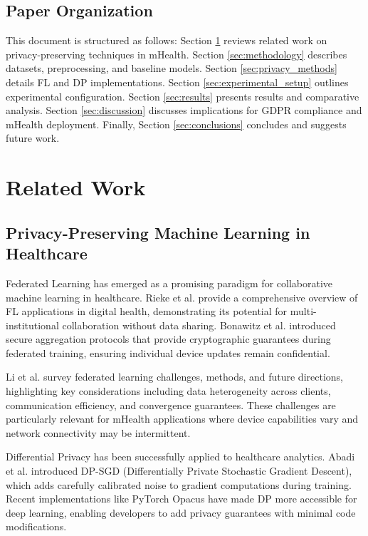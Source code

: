 \documentclass[conference]{IEEEtran}
\begin{document}
\subsection{Paper Organization}

This document is structured as follows: Section \ref{sec:related_work} reviews related work on privacy-preserving techniques in mHealth. Section \ref{sec:methodology} describes datasets, preprocessing, and baseline models. Section \ref{sec:privacy_methods} details FL and DP implementations. Section \ref{sec:experimental_setup} outlines experimental configuration. Section \ref{sec:results} presents results and comparative analysis. Section \ref{sec:discussion} discusses implications for GDPR compliance and mHealth deployment. Finally, Section \ref{sec:conclusions} concludes and suggests future work.

\section{Related Work}
\label{sec:related_work}

\subsection{Privacy-Preserving Machine Learning in Healthcare}

Federated Learning has emerged as a promising paradigm for collaborative machine learning in healthcare. Rieke et al. \cite{rieke2020future} provide a comprehensive overview of FL applications in digital health, demonstrating its potential for multi-institutional collaboration without data sharing. Bonawitz et al. \cite{bonawitz2017practical} introduced secure aggregation protocols that provide cryptographic guarantees during federated training, ensuring individual device updates remain confidential.

Li et al. \cite{li2020federated} survey federated learning challenges, methods, and future directions, highlighting key considerations including data heterogeneity across clients, communication efficiency, and convergence guarantees. These challenges are particularly relevant for mHealth applications where device capabilities vary and network connectivity may be intermittent.

Differential Privacy has been successfully applied to healthcare analytics. Abadi et al. \cite{abadi2016deep} introduced DP-SGD (Differentially Private Stochastic Gradient Descent), which adds carefully calibrated noise to gradient computations during training. Recent implementations like PyTorch Opacus \cite{yousefpour2021opacus} have made DP more accessible for deep learning, enabling developers to add privacy guarantees with minimal code modifications.
\end{document}
